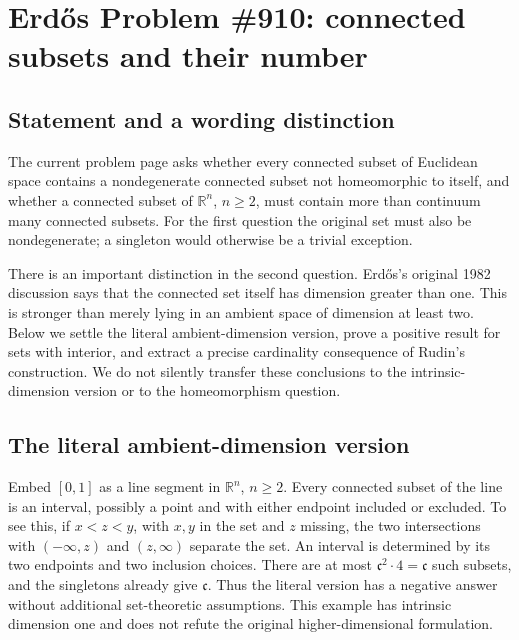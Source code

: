 \section*{Erd\H{o}s Problem \#910: connected subsets and their number}
\subsection*{Statement and a wording distinction}
The current problem page asks whether every connected subset of Euclidean space contains a nondegenerate connected subset not homeomorphic to itself, and whether a connected subset of \(\mathbb R^n\), \(n\geq2\), must contain more than continuum many connected subsets.
For the first question the original set must also be nondegenerate; a singleton would otherwise be a trivial exception.

There is an important distinction in the second question. Erd\H{o}s's original 1982 discussion says that the connected set itself has dimension greater than one. This is stronger than merely lying in an ambient space of dimension at least two.
Below we settle the literal ambient-dimension version, prove a positive result for sets with interior, and extract a precise cardinality consequence of Rudin's construction. We do not silently transfer these conclusions to the intrinsic-dimension version or to the homeomorphism question.

\subsection*{The literal ambient-dimension version}
Embed \([0,1]\) as a line segment in \(\mathbb R^n\), \(n\geq2\).
Every connected subset of the line is an interval, possibly a point and with either endpoint included or excluded.
To see this, if \(x<z<y\), with \(x,y\) in the set and \(z\) missing, the two intersections with \((-\infty,z)\) and \((z,\infty)\) separate the set.
An interval is determined by its two endpoints and two inclusion choices.
There are at most \(\mathfrak c^2\cdot4=\mathfrak c\) such subsets, and the singletons already give \(\mathfrak c\).
Thus the literal version has a negative answer without additional set-theoretic assumptions.
This example has intrinsic dimension one and does not refute the original higher-dimensional formulation.

